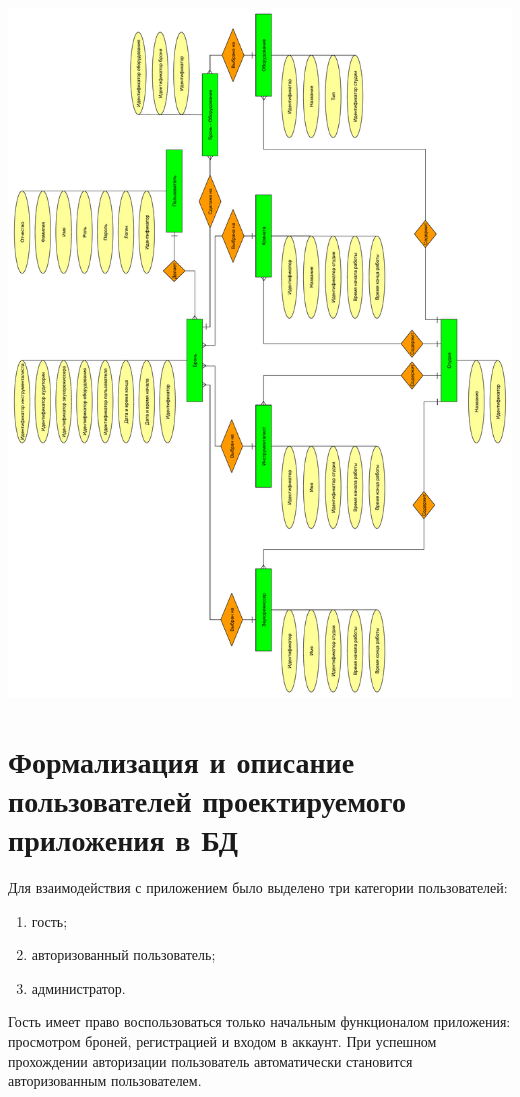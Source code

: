 \begin{center}
	\centering
	\includegraphics[height=0.9\textheight]{inc/img/er_90.pdf}
	\label{img:er}
\end{center}

\section{Формализация и описание пользователей проектируемого приложения в БД}
Для взаимодействия с приложением было выделено три категории пользователей:
\begin{enumerate}
	\item гость;
	\item авторизованный пользователь;
	\item администратор.
\end{enumerate}

Гость имеет право воспользоваться только начальным функционалом приложения: просмотром броней, регистрацией и входом в аккаунт.
При успешном прохождении авторизации пользователь автоматически становится авторизованным пользователем.

